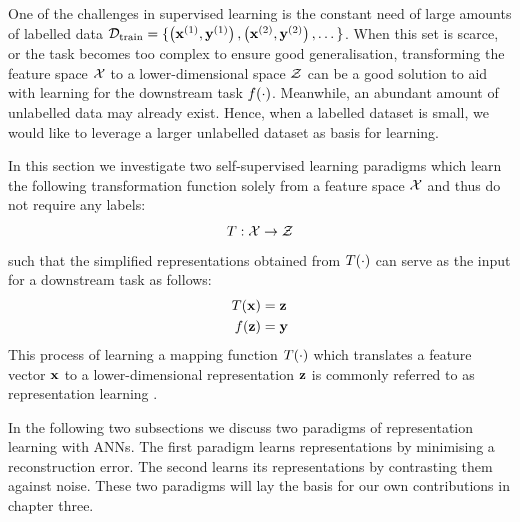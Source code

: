
One of the challenges in supervised learning is the constant need of large amounts of labelled data $\mathcal{D}_{\text{train}} = \{ \left( \mathbf{x}^{(1)}, \mathbf{y}^{(1)} \right), \left( \mathbf{x}^{(2)}, \mathbf{y}^{(2)} \right), \dots \}$. When this set is scarce, or the task becomes too complex to ensure good generalisation, transforming the feature space $\mathcal{X}$ to a lower-dimensional space $\mathcal{Z}$ can be a good solution to aid with learning for the downstream task $f(\cdot)$. Meanwhile, an abundant amount of unlabelled data may already exist. Hence, when a labelled dataset is small, we would like to leverage a larger unlabelled dataset as basis for learning.

In this section we investigate two self-supervised learning paradigms which learn the following transformation function solely from a feature space $\mathcal{X}$ and thus do not require any labels:
$$T: \mathcal{X} \rightarrow \mathcal{Z}$$
such that the simplified representations obtained from $T(\cdot)$ can serve as the input for a downstream task as follows:
\begin{align*}
	T(\mathbf{x}) &=  \mathbf{z} \\
	f(\mathbf{z}) &= \mathbf{y} 
\end{align*}
This process of learning a mapping function $T(\cdot)$ which translates a feature vector $\mathbf{x}$ to a lower-dimensional representation $\mathbf{z}$ is commonly referred to as representation learning \citep{le-khacContrastiveRepresentationLearning2020}. 

In the following two subsections we discuss two paradigms of representation learning with ANNs. The first paradigm learns representations by minimising a reconstruction error. The second learns its representations by contrasting them against noise. These two paradigms will lay the basis for our own contributions in chapter three.

